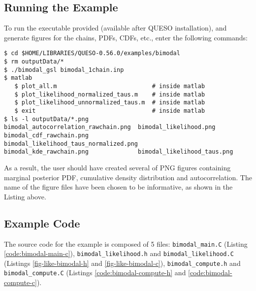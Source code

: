 \subsection{Running the Example}\label{sec:bimodal-run}

To run the executable provided (available after QUESO installation), and generate figures for the chains, PDFs, CDFs, etc., enter the following commands:
\begin{lstlisting}[label={},caption={}]
$ cd $HOME/LIBRARIES/QUESO-0.56.0/examples/bimodal
$ rm outputData/*
$ ./bimodal_gsl bimodal_1chain.inp
$ matlab
   $ plot_all.m	                          # inside matlab
   $ plot_likelihood_normalized_taus.m    # inside matlab
   $ plot_likelihood_unnormalized_taus.m  # inside matlab
   $ exit                                 # inside matlab
$ ls -l outputData/*.png
bimodal_autocorrelation_rawchain.png  bimodal_likelihood.png
bimodal_cdf_rawchain.png	          bimodal_likelihood_taus_normalized.png
bimodal_kde_rawchain.png	          bimodal_likelihood_taus.png
\end{lstlisting}


As a result, the user should have created several of PNG figures containing marginal posterior PDF, cumulative density distribution and autocorrelation. The name of the figure files have been chosen to be informative, as shown in the Listing above.




\subsection{Example Code}\label{sec:bimodal-code}

The source code for the example is composed of 5 files:
\texttt{bimodal\_main.C} (Listing \ref{code:bimodal-main-c}), \linebreak
\texttt{bimodal\_likelihood.h} and \texttt{bimodal\_likelihood.C} (Listings \ref{fig-like-bimodal-h} and \ref{fig-like-bimodal-c}),
\texttt{bimodal\_compute.h} and \texttt{bimodal\_compute.C} (Listings \ref{code:bimodal-compute-h} and \ref{code:bimodal-compute-c}).






